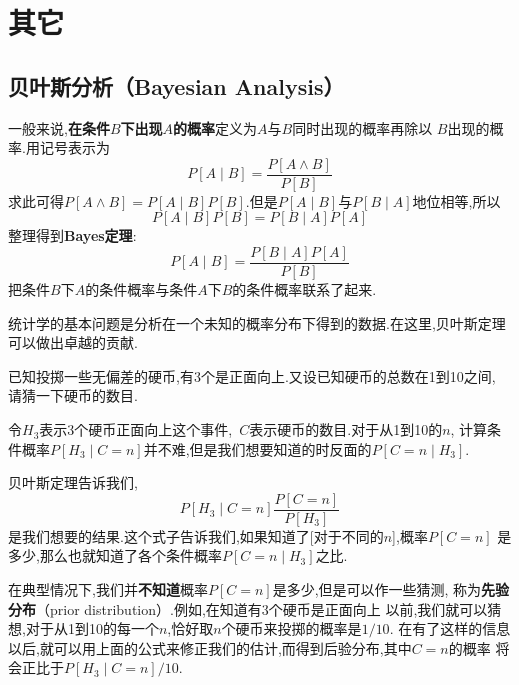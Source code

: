 \documentclass[cn,10pt,citestyle=gb7714-2015,bibstyle=gb7714-2015]{elegantbook}
\renewcommand{\emph}[1]{\textbf{#1}}%
\begin{document}
\chapter{其它}
\section{贝叶斯分析（Bayesian Analysis）}\label{sec:Bayesian Analysis}
一般来说,\emph{在条件$B$下出现$A$的概率}定义为$A$与$B$同时出现的概率再除以
$B$出现的概率.用记号表示为
\[
    P[A\mid B]=\frac{P[A\wedge B]}{P[B]}
\]
求此可得$P[A\wedge B]=P[A\mid B]P[B]$.但是$P[A\mid B]$与$P[B\mid A]$地位相等,所以
\[
    P[A\mid B]P[B]=P[B\mid A]P[A]
\]
整理得到\emph{Bayes定理}:
\[
    P[A\mid B]=\frac{P[B\mid A]P[A]}{P[B]}
\]
把条件$B$下$A$的条件概率与条件$A$下$B$的条件概率联系了起来.

统计学的基本问题是分析在一个未知的概率分布下得到的数据.在这里,贝叶斯定理
可以做出卓越的贡献.
\begin{example}
  已知投掷一些无偏差的硬币,有3个是正面向上.又设已知硬币的总数在1到10之间,
  请猜一下硬币的数目.
\end{example}
\begin{note}
  令$H_3$表示3个硬币正面向上这个事件,\ $C$表示硬币的数目.对于从1到10的$n$,
  计算条件概率$P[H_3\mid C=n]$并不难,但是我们想要知道的时反面的$P[C=n\mid H_3]$.
\end{note}
\begin{solution}
  贝叶斯定理告诉我们,
  \[
      P[H_3\mid C=n]\frac{P[C=n]}{P[H_3]}
  \]
  是我们想要的结果.这个式子告诉我们,如果知道了[对于不同的$n$],概率$P[C=n]$
  是多少,那么也就知道了各个条件概率$P[C=n\mid H_3]$之比.
\end{solution}
在典型情况下,我们并\emph{不知道}概率$P[C=n]$是多少,但是可以作一些猜测,
称为\emph{先验分布}（prior distribution）.例如,在知道有3个硬币是正面向上
以前,我们就可以猜想,对于从1到10的每一个$n$,恰好取$n$个硬币来投掷的概率是$1/10$.
在有了这样的信息以后,就可以用上面的公式来修正我们的估计,而得到后验分布,其中$C=n$的概率
将会正比于$P[H_3\mid C=n]/10$.
\end{document}
